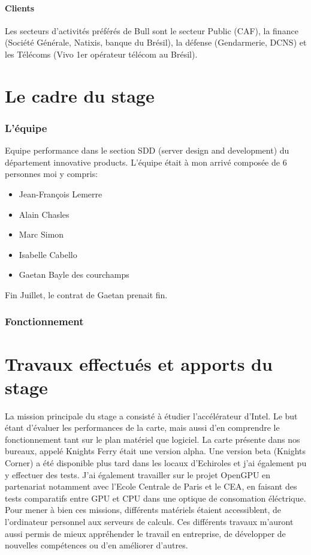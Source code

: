 \documentclass[11pt]{article}
\begin{document}
		\subsection{Clients}
			Les secteurs d'activités préférés de Bull sont le secteur Public (CAF), la finance (Société Générale, Natixis, banque du Brésil), la défense (Gendarmerie, DCNS) 
			et les Télécoms (Vivo 1er opérateur télécom au Brésil).

\newpage
{}
\part{Le cadre du stage}
	\section{L'équipe}
	Equipe performance dans le section SDD (server design and development) du département innovative products. L'équipe était 
	à mon arrivé composée de 6 personnes moi y compris:
	\begin{itemize}
	\item Jean-François Lemerre
	\item Alain Chasles
	\item Marc Simon
	\item Isabelle Cabello
	\item Gaetan Bayle des courchamps
	\end{itemize}
	Fin Juillet, le contrat de Gaetan prenait fin.
	\section{Fonctionnement}

\newpage
{}
\part{Travaux effectués et apports du stage}
La mission principale du stage a consisté à étudier l'accélérateur d'Intel. Le but étant d'évaluer les performances de la carte,
mais aussi d'en comprendre le fonctionnement tant sur le plan matériel que logiciel. La carte présente dans nos bureaux,
appelé Knights Ferry était une version alpha. Une version beta (Knights Corner) a été disponible plus tard dans les locaux
d'Echiroles et j'ai également pu y effectuer des tests. \newline
J'ai également travailler sur le projet OpenGPU en partenariat notamment avec l'Ecole Centrale de Paris et le CEA,
en faisant des tests comparatifs entre GPU et CPU dans une optique de consomation éléctrique. \newline
Pour mener à bien ces missions, différents matériels étaient accessiblent, de l'ordinateur personnel aux serveurs de calculs.
Ces différents travaux m'auront aussi permis de mieux appréhender le travail en entreprise, de développer de nouvelles compétences 
ou d'en améliorer d'autres.
\end{document}
